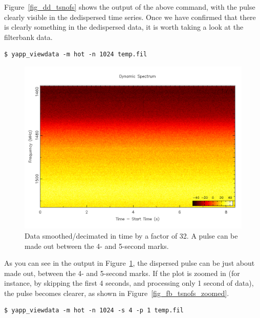 \documentclass{article}
\begin{document}
Figure~\ref{fig_dd_tsnofs} shows the output of the above command, with the
pulse clearly visible in the dedispersed time series. Once we have confirmed
that there is clearly something in the dedispersed data, it is worth taking a
look at the filterbank data.

\small{
\begin{verbatim}
$ yapp_viewdata -m hot -n 1024 temp.fil
\end{verbatim}
}

\begin{figure}[h]
\includegraphics[width=\textwidth]{fb_tsnofs.png}
\caption{Data smoothed/decimated in time by a factor of 32. A pulse can be made
    out between the 4- and 5-second marks.
    \label{fig_fb_tsnofs}}
\end{figure}

As you can see in the output in Figure~\ref{fig_fb_tsnofs}, the dispersed pulse
can be just about made out, between the 4- and 5-second marks. If the plot is
zoomed in (for instance, by skipping the first 4 seconds, and processing only 1
second of data), the pulse becomes clearer, as shown in
Figure~\ref{fig_fb_tsnofs_zoomed}.

\small{
\begin{verbatim}
$ yapp_viewdata -m hot -n 1024 -s 4 -p 1 temp.fil
\end{verbatim}
}
\end{document}
